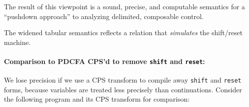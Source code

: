 The result of this viewpoint is a sound, precise, and computable semantics for a ``pushdown approach'' to analyzing delimited, composable control.

\begin{theorem}\label{thm:sound-sr}
  The widened tabular semantics reflects a relation that \emph{simulates} the shift/reset machine.
\end{theorem}

\paragraph{Comparison to PDCFA CPS'd to remove {\tt shift} and {\tt reset}:}{
We lose precision if we use a CPS transform to compile away {\tt shift} and {\tt reset} forms, because variables are treated less precisely than continuations.
%
%
%
Consider the following program and its CPS transform for comparison:
\begin{small}
\begin{SCodeFlow}\begin{RktBlk}\begin{SingleColumn}\RktPn{(}\mbox{}\RktPn{(}\RktPn{[}\mbox{}\RktPn{(}\RktSym{$\lambda$}\mbox{}\RktPn{(}\RktPn{)}\mbox{}\RktPn{)}\RktPn{]}

\mbox{}\RktPn{[}\mbox{}\RktPn{(}\RktSym{$\lambda$}\mbox{}\RktPn{(}\RktPn{)}\mbox{}\RktPn{(}\mbox{}\mbox{}\RktPn{(}\mbox{}\RktPn{(}\mbox{}\RktPn{)}\RktPn{)}\RktPn{)}\RktPn{)}\RktPn{]}


\end{SingleColumn}
\end{RktBlk}
\end{SCodeFlow}
\end{small}}
